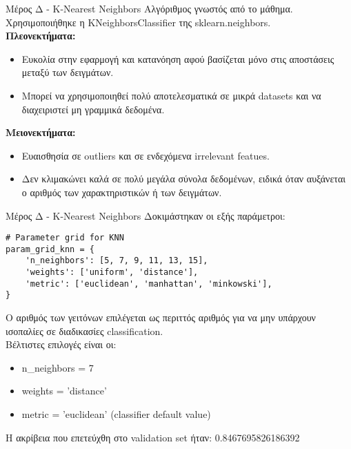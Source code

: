 \documentclass{beamer}
\begin{document}
\begin{frame}[fragile]{Μέρος Δ - K-Nearest Neighbors}
Αλγόριθμος γνωστός από το μάθημα. Χρησιμοποιήθηκε η KNeighborsClassifier της sklearn.neighbors.\\
\textbf{Πλεονεκτήματα:}
\begin{itemize}
    \item Ευκολία στην εφαρμογή και κατανόηση αφού βασίζεται μόνο στις αποστάσεις μεταξύ των δειγμάτων.
    \item Μπορεί να χρησιμοποιηθεί πολύ αποτελεσματικά σε μικρά datasets και να διαχειριστεί μη γραμμικά δεδομένα.
\end{itemize}
\textbf{Μειονεκτήματα:}
\begin{itemize}
    \item Ευαισθησία σε outliers και σε ενδεχόμενα irrelevant featues.
    \item Δεν κλιμακώνει καλά σε πολύ μεγάλα σύνολα δεδομένων, ειδικά όταν αυξάνεται ο αριθμός των χαρακτηριστικών ή των δειγμάτων.
\end{itemize}
\end{frame}
\begin{frame}[fragile]{Μέρος Δ - K-Nearest Neighbors}
Δοκιμάστηκαν οι εξής παράμετροι:
\lstset{style=python}
\begin{lstlisting}
# Parameter grid for KNN
param_grid_knn = {
    'n_neighbors': [5, 7, 9, 11, 13, 15],
    'weights': ['uniform', 'distance'], 
    'metric': ['euclidean', 'manhattan', 'minkowski'],
}
\end{lstlisting}
Ο αριθμός των γειτόνων επιλέγεται ως περιττός αριθμός για να μην υπάρχουν ισοπαλίες σε διαδικασίες classification.\\
Βέλτιστες επιλογές είναι οι:
\begin{itemize}
    \item n\_neighbors = 7
    \item weights = 'distance' 
    \item metric = 'euclidean' (classifier default value)
\end{itemize}

Η ακρίβεια που επετεύχθη στο validation set ήταν: 0.8467695826186392
\end{frame}
\end{document}

